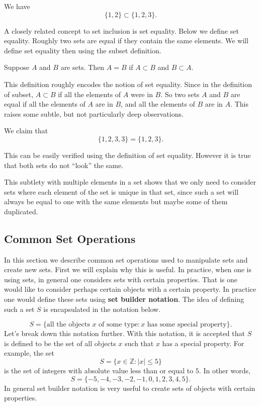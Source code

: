 \begin{example}
We have 
\[\{1, 2\} \subset \{1, 2, 3\}.\]
\end{example}

A closely related concept to set inclusion is set equality. Below we define set equality. Roughly two sets are equal if they contain the same elements. We will define set equality then using the subset definition.
\begin{definition}
Suppose $A$ and $B$ are sets. Then $A = B$ if $A \subset B$ and $B \subset A$.
\end{definition}

This definition roughly encodes the notion of set equality. Since in the definition of subset, $A \subset B$ if all the elements of $A$ were in $B$. So two sets $A$ and $B$ are equal if all the elements of $A$ are in $B$, and all the elements of $B$ are in $A$. This raises some subtle, but not particularly deep observations.

\begin{example}
We claim that 
\[\{1, 2, 3, 3\} = \{1, 2, 3\}.\]

This can be easily verified using the definition of set equality. However it is true that both sets do not ``look'' the same. 
\end{example}

This subtlety with multiple elements in a set shows that we only need to consider sets where each element of the set is unique in that set, since such a set will always be equal to one with the same elements but maybe some of them duplicated. %

\subsection{Common Set Operations}

In this section we describe common set operations used to manipulate sets and create new sets. First we will explain why this is useful. In practice, when one is using sets, in general one considers sets with certain properties. That is one would like to consider perhaps certain objects with a certain property. In practice one would define these sets using \textbf{set builder notation}. The idea of defining such a set $S$ is encapsulated in the notation below.

\[S = \{\text{all the objects $x$ of some type} \colon \text{$x$ has some special property}\}.\]
Let's break down this notation further. With this notation, it is accepted that $S$ is defined to be the set of all objects $x$ such that $x$ has a special property. For example, the set 
\[S = \{x \in \mathbb{Z} \colon |x| \leq 5\}\]
is the set of integers with absolute value less than or equal to $5$. In other words,
\[S = \{-5, -4, -3, -2, -1, 0, 1, 2, 3, 4, 5\}.\]
In general set builder notation is very useful to create sets of objects with certain properties.